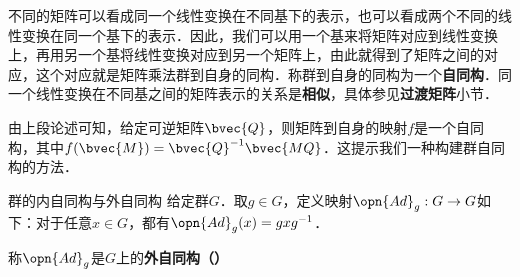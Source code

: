 不同的矩阵可以看成同一个线性变换在不同基下的表示，也可以看成两个不同的线性变换在同一个基下的表示．因此，我们可以用一个基来将矩阵对应到线性变换上，再用另一个基将线性变换对应到另一个矩阵上，由此就得到了矩阵之间的对应，这个对应就是矩阵乘法群到自身的同构．称群到自身的同构为一个\textbf{自同构}．同一个线性变换在不同基之间的矩阵表示的关系是\textbf{相似}，具体参见\textbf{过渡矩阵}小节．

由上段论述可知，给定可逆矩阵$\bvec{Q}$，则矩阵到自身的映射$f$是一个自同构，其中$f(\bvec{M})=\bvec{Q}^{-1}\bvec{MQ}$．这提示我们一种构建群自同构的方法．

\begin{definition}{群的内自同构与外自同构}
给定群$G$．取$g\in G$，定义映射$\opn{Ad}_g:G\to G$如下：对于任意$x\in G$，都有$\opn{Ad}_g(x)=gxg^{-1}$．

称$\opn{Ad}_g$是$G$上的\textbf{外自同构（）}
\end{definition}













